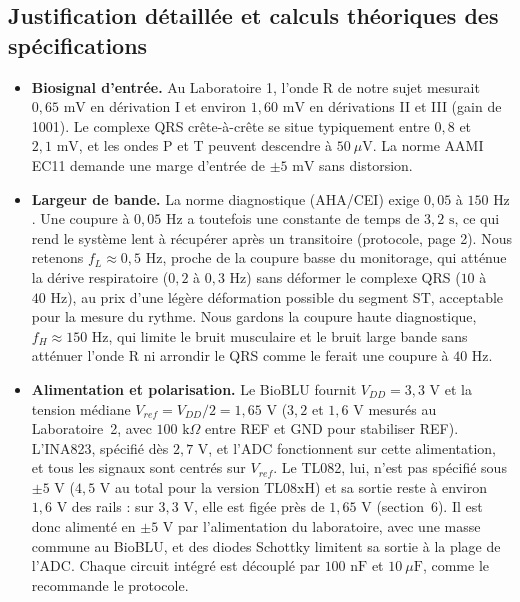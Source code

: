 \documentclass[11pt,letterpaper]{article}
\begin{document}
\subsection*{Justification détaillée et calculs théoriques des spécifications}

\begin{itemize}
\item \textbf{Biosignal d'entrée.} Au Laboratoire 1, l'onde R de notre sujet mesurait $0,65\text{ mV}$ en dérivation I et environ $1,60\text{ mV}$ en dérivations II et III (gain de 1001). Le complexe QRS crête-à-crête se situe typiquement entre $0,8$ et $2,1\text{ mV}$, et les ondes P et T peuvent descendre à $50\ \mu\text{V}$. La norme AAMI EC11 demande une marge d'entrée de $\pm 5\text{ mV}$ sans distorsion.

\item \textbf{Largeur de bande.} La norme diagnostique (AHA/CEI) exige $0,05$ à $150\text{ Hz}$. Une coupure à $0,05\text{ Hz}$ a toutefois une constante de temps de $3,2\text{ s}$, ce qui rend le système lent à récupérer après un transitoire (protocole, page 2). Nous retenons $f_L \approx 0,5\text{ Hz}$, proche de la coupure basse du monitorage, qui atténue la dérive respiratoire ($0,2$ à $0,3\text{ Hz}$) sans déformer le complexe QRS ($10$ à $40\text{ Hz}$), au prix d'une légère déformation possible du segment ST, acceptable pour la mesure du rythme. Nous gardons la coupure haute diagnostique, $f_H \approx 150\text{ Hz}$, qui limite le bruit musculaire et le bruit large bande sans atténuer l'onde R ni arrondir le QRS comme le ferait une coupure à $40\text{ Hz}$.

\item \textbf{Alimentation et polarisation.} Le BioBLU fournit $V_{DD} = 3,3\text{ V}$ et la tension médiane $V_{ref} = V_{DD}/2 = 1,65\text{ V}$ ($3,2$ et $1,6\text{ V}$ mesurés au Laboratoire~2, avec $100\text{ k}\Omega$ entre REF et GND pour stabiliser REF). L'INA823, spécifié dès $2,7\text{ V}$, et l'ADC fonctionnent sur cette alimentation, et tous les signaux sont centrés sur $V_{ref}$. Le TL082, lui, n'est pas spécifié sous $\pm 5\text{ V}$ ($4,5\text{ V}$ au total pour la version TL08xH) et sa sortie reste à environ $1,6\text{ V}$ des rails : sur $3,3\text{ V}$, elle est figée près de $1,65\text{ V}$ (section~6). Il est donc alimenté en $\pm 5\text{ V}$ par l'alimentation du laboratoire, avec une masse commune au BioBLU, et des diodes Schottky limitent sa sortie à la plage de l'ADC. Chaque circuit intégré est découplé par $100\text{ nF}$ et $10\ \mu\text{F}$, comme le recommande le protocole.


\end{itemize}
\end{document}
